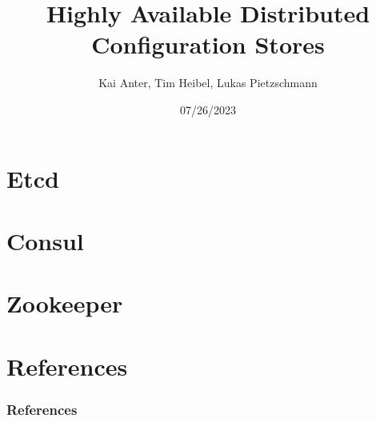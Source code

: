 \documentclass[aspectratio=169, usepdftitle=false]{beamer}
\title[Highly Available Distributed Config Stores]{Highly Available Distributed Configuration Stores}
\author[Kai, Tim, Lukas]{Kai Anter, Tim Heibel, Lukas Pietzschmann}
\subtitle{}
\institute{Institute of Distributed Systems}
\date{07/26/2023}
\begin{document}
\maketitle

\section{Etcd}


\section{Consul}


\section{Zookeeper}


\section{References}
\begin{frame}[allowframebreaks]
	\frametitle{References}
	\printbibliography
\end{frame}
\end{document}

